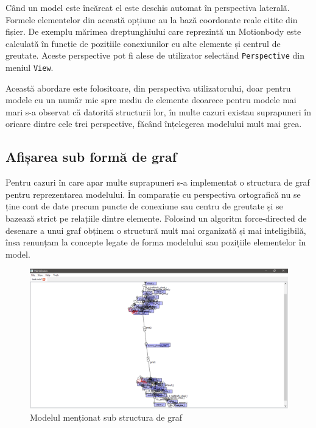 Când un model este încărcat el este deschis automat în perspectiva laterală.
Formele elementelor din această opțiune au la bază coordonate reale citite din fișier. De exemplu mărimea dreptunghiului 
care reprezintă un Motionbody este calculată în funcție de pozițiile conexiunilor cu alte elemente și centrul de 
greutate. Aceste perspective pot fi alese de utilizator selectănd \verb|Perspective| din meniul \verb|View|. \newline

Această abordare este folositoare, din perspectiva utilizatorului, doar pentru modele cu un număr mic spre mediu de elemente 
deoarece pentru modele mai mari s-a observat că datorită structurii lor, în multe cazuri existau suprapuneri în oricare dintre 
cele trei perspective, făcând înțelegerea modelului mult mai grea.\newline 


\subsection{Afișarea sub formă de graf}
Pentru cazuri în care apar multe suprapuneri s-a implementat o structura de graf pentru reprezentarea modelului. 
În comparație cu perspectiva ortografică nu se ține cont de date precum puncte de conexiune sau centru de greutate și se bazează 
strict pe relațiile dintre elemente. Folosind un algoritm force-directed de desenare a unui graf obținem o structură mult mai organizată 
și mai inteligibilă, însa renunțam la concepte legate de forma modelului sau pozițiile elementelor în model.\newline
 
\begin{figure}[H]
    \includegraphics[width=\linewidth]{imagini/implementare/graf.png}
    \caption{Modelul menționat sub structura de graf}
    \label{fig:tabs}
\end{figure}

